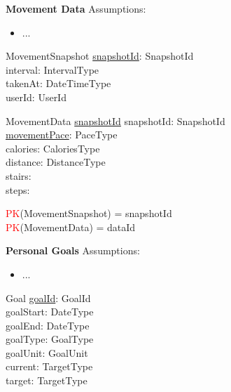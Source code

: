 \documentclass{article}
\begin{document}
\vspace{0.2cm}
\hspace{-0.5cm}\textbf{Movement Data}
\newline \newline Assumptions:
\begin{itemize}
  \item ...
\end{itemize}

\begin{schema}{MovementSnapshot}
	\underline{snapshotId}: SnapshotId \\
    interval: IntervalType \\
    takenAt: DateTimeType \\
    userId: UserId \\
\end{schema}

\begin{schema}{MovementData}
    \underline{snapshotId} snapshotId: SnapshotId \\
    \underline{movementPace}: PaceType \\
    calories: CaloriesType \\
    distance: DistanceType \\ 
    stairs: \nat \\
    steps: \nat \\
\end{schema}

\begin{zed}
\textcolor{red}{PK}(MovementSnapshot) = { snapshotId } \\
\textcolor{red}{PK}(MovementData) = { dataId } \\
\end{zed}
    

\vspace{0.2cm}
\hspace{-0.5cm}\textbf{Personal Goals}
\newline \newline Assumptions:
\begin{itemize}
  \item ...
\end{itemize}

\begin{schema}{Goal}
	\underline{goalId}: GoalId \\
    goalStart: DateType \\
    goalEnd: DateType \\ 
    goalType: GoalType \\
    goalUnit: GoalUnit \\
    current: TargetType \\
    target: TargetType \\ 
\end{schema}
\end{document}
